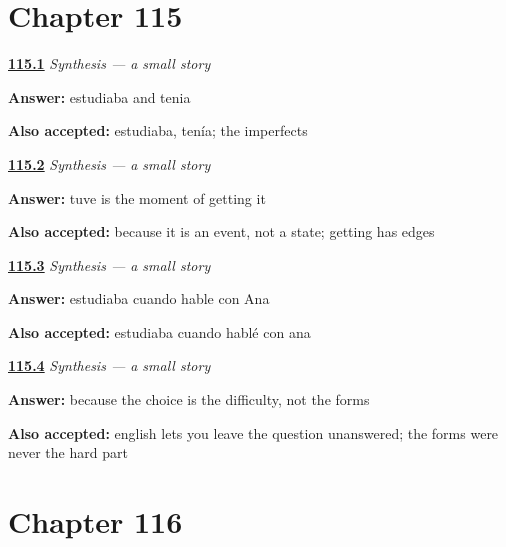 \section*{Chapter 115}

\noindent\begin{minipage}[t]{\linewidth}
\raggedright
\hyperlink{review-ES-C48-sintesis-una-historia-layers}{\textbf{115.1}} \emph{Synthesis — a small story}\par
\small \textbf{Answer:} estudiaba and tenia\par
\footnotesize \textbf{Also accepted:} estudiaba, tenía; the imperfects
\end{minipage}\par\medskip

\noindent\begin{minipage}[t]{\linewidth}
\raggedright
\hyperlink{review-ES-C48-sintesis-una-historia-third}{\textbf{115.2}} \emph{Synthesis — a small story}\par
\small \textbf{Answer:} tuve is the moment of getting it\par
\footnotesize \textbf{Also accepted:} because it is an event, not a state; getting has edges
\end{minipage}\par\medskip

\noindent\begin{minipage}[t]{\linewidth}
\raggedright
\hyperlink{review-ES-C48-sintesis-una-historia-tell}{\textbf{115.3}} \emph{Synthesis — a small story}\par
\small \textbf{Answer:} estudiaba cuando hable con Ana\par
\footnotesize \textbf{Also accepted:} estudiaba cuando hablé con ana
\end{minipage}\par\medskip

\noindent\begin{minipage}[t]{\linewidth}
\raggedright
\hyperlink{review-ES-C48-sintesis-una-historia-why}{\textbf{115.4}} \emph{Synthesis — a small story}\par
\small \textbf{Answer:} because the choice is the difficulty, not the forms\par
\footnotesize \textbf{Also accepted:} english lets you leave the question unanswered; the forms were never the hard part
\end{minipage}\par\medskip

\section*{Chapter 116}

